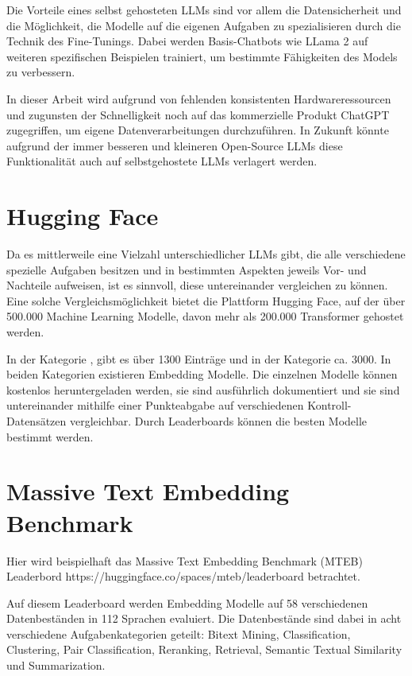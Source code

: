 Die Vorteile eines selbst gehosteten LLMs sind vor allem die Datensicherheit und die Möglichkeit, die Modelle auf die eigenen Aufgaben zu spezialisieren durch die Technik des Fine-Tunings.
Dabei werden Basis-Chatbots wie LLama 2 auf weiteren spezifischen Beispielen trainiert, um bestimmte Fähigkeiten des Models zu verbessern.

In dieser Arbeit wird aufgrund von fehlenden konsistenten Hardwareressourcen und zugunsten der Schnelligkeit noch auf das kommerzielle Produkt ChatGPT zugegriffen, um eigene Datenverarbeitungen durchzuführen.
In Zukunft könnte aufgrund der immer besseren und kleineren Open-Source LLMs diese Funktionalität auch auf selbstgehostete LLMs verlagert werden.

\section{Hugging Face}

Da es mittlerweile eine Vielzahl unterschiedlicher LLMs gibt, die alle verschiedene spezielle Aufgaben besitzen und in bestimmten Aspekten jeweils Vor- und Nachteile aufweisen, ist es sinnvoll, diese untereinander vergleichen zu können.
Eine solche Vergleichsmöglichkeit bietet die Plattform Hugging Face, auf der über 500.000 Machine Learning Modelle, davon mehr als 200.000 Transformer gehostet werden.

In der Kategorie , gibt es über 1300 Einträge und in der Kategorie  ca. 3000.
In beiden Kategorien existieren Embedding Modelle.
Die einzelnen Modelle können kostenlos heruntergeladen werden, sie sind ausführlich dokumentiert und sie sind untereinander mithilfe einer Punkteabgabe auf verschiedenen Kontroll-Datensätzen vergleichbar.
Durch Leaderboards können die besten Modelle bestimmt werden.

\section{Massive Text Embedding Benchmark}

Hier wird beispielhaft das Massive Text Embedding Benchmark (MTEB) Leaderbord https://huggingface.co/spaces/mteb/leaderboard betrachtet.

Auf diesem Leaderboard werden Embedding Modelle auf 58 verschiedenen Datenbeständen in 112 Sprachen evaluiert.
Die Datenbestände sind dabei in acht verschiedene Aufgabenkategorien geteilt:
Bitext Mining, Classification, Clustering, Pair Classification, Reranking, Retrieval, Semantic Textual Similarity und Summarization.

